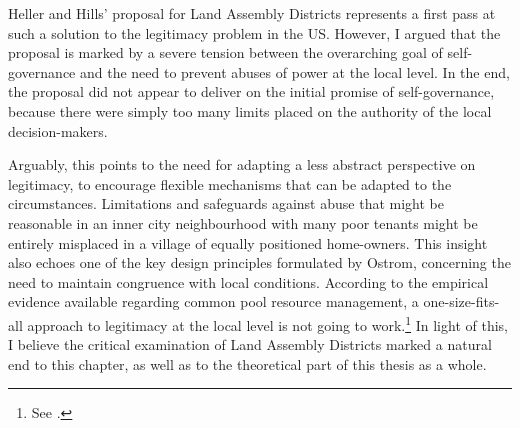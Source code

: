 Heller and Hills' proposal for Land Assembly Districts represents a first pass at such a solution to the legitimacy problem in the US. However, I argued that the proposal is marked by a severe tension between the overarching goal of self-governance and the need to prevent abuses of power at the local level. In the end, the proposal did not appear to deliver on the initial promise of self-governance, because there were simply too many limits placed on the authority of the local decision-makers.

Arguably, this points to the need for adapting a less abstract perspective on legitimacy, to encourage flexible mechanisms that can be adapted to the circumstances. Limitations and safeguards against abuse that might be reasonable in an inner city neighbourhood with many poor tenants might be entirely misplaced in a village of equally positioned home-owners. This insight also echoes one of the key design principles formulated by Ostrom, concerning the need to maintain congruence with local conditions. According to the empirical evidence available regarding common pool resource management, a one-size-fits-all approach to legitimacy at the local level is not going to work.\footnote{See \cite{cox10}.} In light of this, I believe the critical examination of Land Assembly Districts marked a natural end to this chapter, as well as to the theoretical part of this thesis as a whole.

